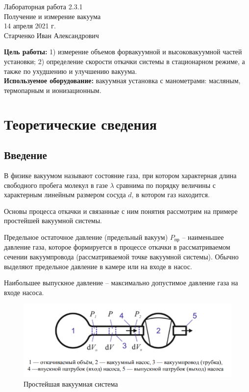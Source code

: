 \documentclass[a4paper, 12pt]{article} %
\begin{document}


\setcounter{page}{1}
\begin{center}
  \LARGE{Лабораторная работа 2.3.1}\\[0.2cm]
  \LARGE{Получение и измерение вакуума}\\[0.2cm]
  \large{14 апреля 2021 г.}\\[0.2cm]
  \large{Старченко Иван Александрович}\\[0.2cm]
\end{center}



\textbf{Цель работы:} 1) измерение объемов форвакуумной и высоковакуумной частей установки; 2) определение скорости откачки системы в стационарном режиме, а также по ухудшению и улучшению вакуума.\\

\textbf{Используемое оборудование:} вакуумная установка с манометрами: масляным, термопарным и ионизационным.

\section{Теоретические сведения}
\subsection{Введение}

В физике вакуумом называют состояние газа, при котором характерная длина свободного пробега молекул в газе $\lambda$ сравнима по порядку
величины с характерным линейным размером сосуда $d$, в котором газ
находится.

Основы процесса откачки и связанные с ним понятия рассмотрим
на примере простейшей вакуумной системы.

Предельное остаточное давление (предельный вакуум) $P_{\text{пр}}$ -- наименьшее давление газа, которое формируется в процессе откачки в рассматриваемом сечении вакуумпровода (рассматриваемой точке вакуумной системы). Обычно выделяют предельное давление в
камере или на входе в насос.

Наибольшее выпускное давление -- максимально допустимое давление газа на входе насоса.

\begin{figure}[h]
    \centering
    \includegraphics[width = 11 cm]{1}
    \caption{Простейшая вакуумная система}
    \label{fig:vac}
\end{figure}
\end{document}
